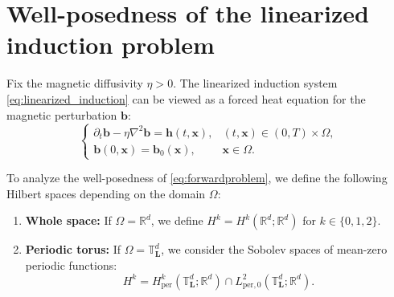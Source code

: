 \documentclass[12pt]{article}
\begin{document}





\section{Well-posedness of the linearized induction problem }\label{sec:forwardmodel}

Fix the magnetic diffusivity $\eta > 0$. The linearized induction system \eqref{eq:linearized_induction} can be viewed as a forced heat equation for the magnetic perturbation $\boldsymbol{b}$:
\begin{equation}
	\left\{
	\begin{array}{ll}
		\partial_t \boldsymbol{b} - \eta \nabla^2 \boldsymbol{b}
		= \boldsymbol{h}(t,\boldsymbol{x}), 
		& (t,\boldsymbol{x}) \in (0,T)\times\Omega, \\[1ex]
		\boldsymbol{b}(0,\boldsymbol{x}) = \boldsymbol{b}_0(\boldsymbol{x}), 
		& \boldsymbol{x}\in\Omega.
	\end{array}
	\right.
	\label{eq:forwardproblem}
\end{equation}



To analyze the well-posedness of \eqref{eq:forwardproblem}, we define the following Hilbert spaces depending on the domain $\Omega$:
\begin{enumerate}\item \textbf{Whole space:} If $\Omega = \mathbb{R}^d$, we define $H^k = H^k(\mathbb{R}^d; \mathbb{R}^d)$ for $k \in \{0, 1, 2\}$.\item \textbf{Periodic torus:} If $\Omega = \mathbb{T}^d_{\boldsymbol{L}}$, we consider the Sobolev spaces of mean-zero periodic functions:$$ H^k = H^k_{\mathrm{per}}(\mathbb{T}^d_{\boldsymbol{L}}; \mathbb{R}^d) \cap L^2_{\mathrm{per},0}(\mathbb{T}^d_{\boldsymbol{L}}; \mathbb{R}^d). $$\end{enumerate}
\end{document}
